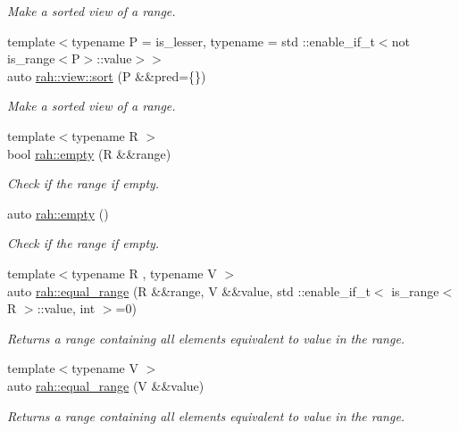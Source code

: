 \begin{DoxyCompactItemize}
\begin{DoxyCompactList}\small\item\em Make a sorted view of a range. \end{DoxyCompactList}\item 
{\footnotesize template$<$typename P  = is\+\_\+lesser, typename  = std \+::enable\+\_\+if\+\_\+t$<$not is\+\_\+range$<$\+P$>$\+::value$>$$>$ }\\auto \mbox{\hyperlink{namespacerah_1_1view_aee3389bbe781c123aceb0d017a470e11}{rah\+::view\+::sort}} (P \&\&pred=\{\})
\begin{DoxyCompactList}\small\item\em Make a sorted view of a range. \end{DoxyCompactList}\item 
{\footnotesize template$<$typename R $>$ }\\bool \mbox{\hyperlink{namespacerah_a51feb1497566c28de396f50735fd259b}{rah\+::empty}} (R \&\&range)
\begin{DoxyCompactList}\small\item\em Check if the range if empty. \end{DoxyCompactList}\item 
auto \mbox{\hyperlink{namespacerah_a6ceb90c934b1c4927ab4e08b985ef6c5}{rah\+::empty}} ()
\begin{DoxyCompactList}\small\item\em Check if the range if empty. \end{DoxyCompactList}\item 
{\footnotesize template$<$typename R , typename V $>$ }\\auto \mbox{\hyperlink{namespacerah_a984a8f5d104b54913aefe80077c2026f}{rah\+::equal\+\_\+range}} (R \&\&range, V \&\&value, std \+::enable\+\_\+if\+\_\+t$<$ is\+\_\+range$<$ R $>$\+::value, int $>$=0)
\begin{DoxyCompactList}\small\item\em Returns a range containing all elements equivalent to value in the range. \end{DoxyCompactList}\item 
{\footnotesize template$<$typename V $>$ }\\auto \mbox{\hyperlink{namespacerah_afa191bbe5b7dbb9b2e7a21a87dbb9a8a}{rah\+::equal\+\_\+range}} (V \&\&value)
\begin{DoxyCompactList}\small\item\em Returns a range containing all elements equivalent to value in the range. \end{DoxyCompactList}\item 

\end{DoxyCompactItemize}
